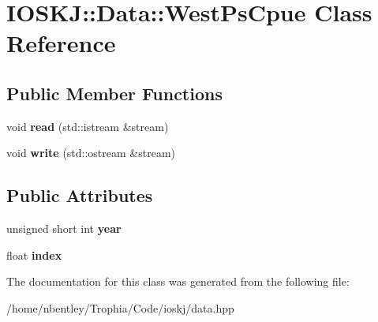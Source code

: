 \hypertarget{classIOSKJ_1_1Data_1_1WestPsCpue}{\section{I\-O\-S\-K\-J\-:\-:Data\-:\-:West\-Ps\-Cpue Class Reference}
\label{classIOSKJ_1_1Data_1_1WestPsCpue}
}
\subsection*{Public Member Functions}
\begin{DoxyCompactItemize}
\item 
\hypertarget{classIOSKJ_1_1Data_1_1WestPsCpue_a4a66b4d327983bbcc8262cae217c7ede}{void {\bfseries read} (std\-::istream \&stream)}\label{classIOSKJ_1_1Data_1_1WestPsCpue_a4a66b4d327983bbcc8262cae217c7ede}

\item 
\hypertarget{classIOSKJ_1_1Data_1_1WestPsCpue_a21ae334f9ae536b2624e403c3b77216f}{void {\bfseries write} (std\-::ostream \&stream)}\label{classIOSKJ_1_1Data_1_1WestPsCpue_a21ae334f9ae536b2624e403c3b77216f}

\end{DoxyCompactItemize}
\subsection*{Public Attributes}
\begin{DoxyCompactItemize}
\item 
\hypertarget{classIOSKJ_1_1Data_1_1WestPsCpue_a76ed2a7cfc9dc71cd96e979a9310a4c7}{unsigned short int {\bfseries year}}\label{classIOSKJ_1_1Data_1_1WestPsCpue_a76ed2a7cfc9dc71cd96e979a9310a4c7}

\item 
\hypertarget{classIOSKJ_1_1Data_1_1WestPsCpue_a93d81fdc1e2168e56d3c7fc1173c493a}{float {\bfseries index}}\label{classIOSKJ_1_1Data_1_1WestPsCpue_a93d81fdc1e2168e56d3c7fc1173c493a}

\end{DoxyCompactItemize}


The documentation for this class was generated from the following file\-:\begin{DoxyCompactItemize}
\item 
/home/nbentley/\-Trophia/\-Code/ioskj/data.\-hpp\end{DoxyCompactItemize}
